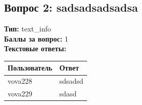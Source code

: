 \documentclass[a4paper,12pt]{article}
\begin{document}
\subsection*{Вопрос 2: sadsadsadsadsa}
\textbf{Тип:} text_info \\
\textbf{Баллы за вопрос:} 1 \\
\textbf{Текстовые ответы:} \\

\begin{longtable}{ll}
    \toprule
    Пользователь & Ответ \\
    \midrule
    vova228 & sdsadsd \\
    vova229 & sdasd \\
    \bottomrule
\end{longtable}
\end{document}
